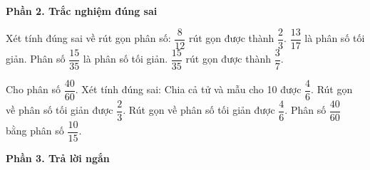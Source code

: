 \textbf{Phần 2. Trắc nghiệm đúng sai}

\begin{ex} %
Xét tính đúng sai về rút gọn phân số:
\choiceTF
{\True $\dfrac{8}{12}$ rút gọn được thành $\dfrac{2}{3}$.}
{\True $\dfrac{13}{17}$ là phân số tối giản.}
{Phân số $\dfrac{15}{35}$ là phân số tối giản.}
{\True $\dfrac{15}{35}$ rút gọn được thành $\dfrac{3}{7}$.}
\end{ex}

\begin{ex} %
Cho phân số $\dfrac{40}{60}$. Xét tính đúng sai:
\choiceTF
{\True Chia cả tử và mẫu cho 10 được $\dfrac{4}{6}$.}
{\True Rút gọn về phân số tối giản được $\dfrac{2}{3}$.}
{Rút gọn về phân số tối giản được $\dfrac{4}{6}$.}
{\True Phân số $\dfrac{40}{60}$ bằng phân số $\dfrac{10}{15}$.}
\end{ex}

\textbf{Phần 3. Trả lời ngắn}

